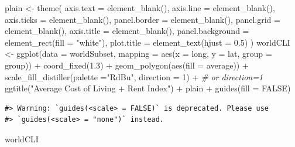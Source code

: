 \documentclass[
  11pt,
  a4paper,
  twoside]{scrbook}
\newenvironment{Shaded}{\begin{snugshade}}{\end{snugshade}}
\newcommand{\AttributeTok}[1]{\textcolor[rgb]{0.77,0.63,0.00}{#1}}
\newcommand{\CommentTok}[1]{\textcolor[rgb]{0.56,0.35,0.01}{\textit{#1}}}
\newcommand{\ConstantTok}[1]{\textcolor[rgb]{0.00,0.00,0.00}{#1}}
\newcommand{\DecValTok}[1]{\textcolor[rgb]{0.00,0.00,0.81}{#1}}
\newcommand{\FloatTok}[1]{\textcolor[rgb]{0.00,0.00,0.81}{#1}}
\newcommand{\FunctionTok}[1]{\textcolor[rgb]{0.00,0.00,0.00}{#1}}
\newcommand{\NormalTok}[1]{#1}
\newcommand{\OtherTok}[1]{\textcolor[rgb]{0.56,0.35,0.01}{#1}}
\newcommand{\SpecialCharTok}[1]{\textcolor[rgb]{0.00,0.00,0.00}{#1}}
\newcommand{\StringTok}[1]{\textcolor[rgb]{0.31,0.60,0.02}{#1}}
\begin{document}
\linespread{1}

\begin{Shaded}
\begin{Highlighting}[]

\NormalTok{plain }\OtherTok{\textless{}{-}} \FunctionTok{theme}\NormalTok{(}
  \AttributeTok{axis.text =} \FunctionTok{element\_blank}\NormalTok{(),}
  \AttributeTok{axis.line =} \FunctionTok{element\_blank}\NormalTok{(),}
  \AttributeTok{axis.ticks =} \FunctionTok{element\_blank}\NormalTok{(),}
  \AttributeTok{panel.border =} \FunctionTok{element\_blank}\NormalTok{(),}
  \AttributeTok{panel.grid =} \FunctionTok{element\_blank}\NormalTok{(),}
  \AttributeTok{axis.title =} \FunctionTok{element\_blank}\NormalTok{(),}
  \AttributeTok{panel.background =} \FunctionTok{element\_rect}\NormalTok{(}\AttributeTok{fill =} \StringTok{"white"}\NormalTok{),}
  \AttributeTok{plot.title =} \FunctionTok{element\_text}\NormalTok{(}\AttributeTok{hjust =} \FloatTok{0.5}\NormalTok{)}
\NormalTok{)}
\NormalTok{worldCLI }\OtherTok{\textless{}{-}} \FunctionTok{ggplot}\NormalTok{(}\AttributeTok{data =}\NormalTok{ worldSubset, }\AttributeTok{mapping =} \FunctionTok{aes}\NormalTok{(}\AttributeTok{x =}\NormalTok{ long, }\AttributeTok{y =}\NormalTok{ lat, }\AttributeTok{group =}\NormalTok{ group)) }\SpecialCharTok{+} 
  \FunctionTok{coord\_fixed}\NormalTok{(}\FloatTok{1.3}\NormalTok{) }\SpecialCharTok{+}
  \FunctionTok{geom\_polygon}\NormalTok{(}\FunctionTok{aes}\NormalTok{(}\AttributeTok{fill =}\NormalTok{ average)) }\SpecialCharTok{+}
  \FunctionTok{scale\_fill\_distiller}\NormalTok{(}\AttributeTok{palette =}\StringTok{"RdBu"}\NormalTok{, }\AttributeTok{direction =} \DecValTok{1}\NormalTok{) }\SpecialCharTok{+} \CommentTok{\# or direction=1}
  \FunctionTok{ggtitle}\NormalTok{(}\StringTok{"Average Cost of Living + Rent Index"}\NormalTok{) }\SpecialCharTok{+}
\NormalTok{  plain }\SpecialCharTok{+}
  \FunctionTok{guides}\NormalTok{(}\AttributeTok{fill =} \ConstantTok{FALSE}\NormalTok{)  }
\end{Highlighting}
\end{Shaded}

\linespread{1}

\begin{verbatim}
#> Warning: `guides(<scale> = FALSE)` is deprecated. Please use
#> `guides(<scale> = "none")` instead.
\end{verbatim}

\linespread{1}

\begin{Shaded}
\begin{Highlighting}[]
\NormalTok{worldCLI}
\end{Highlighting}
\end{Shaded}
\end{document}
